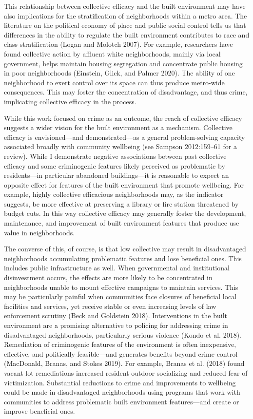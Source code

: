 \documentclass [11pt, proquest] {uwthesis}[2015/03/03]
\begin{document}
This relationship between collective efficacy and the built environment may have also implications for the stratification of neighborhoods within a metro area. The literature on the political economy of place and public social control tells us that differences in the ability to regulate the built environment contributes to race and class stratification (Logan and Molotch 2007). For example, researchers have found collective action by affluent white neighborhoods, mainly via local government, helps maintain housing segregation and concentrate public housing in poor neighborhoods (Einstein, Glick, and Palmer 2020). The ability of one neighborhood to exert control over its space can thus produce metro-wide consequences. This may foster the concentration of disadvantage, and thus crime, implicating collective efficacy in the process.

While this work focused on crime as an outcome, the reach of collective efficacy suggests a wider vision for the built environment as a mechanism. Collective efficacy is envisioned---and demonstrated---as a general problem-solving capacity associated broadly with community wellbeing (see Sampson 2012:159--61 for a review). While I demonstrate negative associations between past collective efficacy and some criminogenic features likely perceived as problematic by residents---in particular abandoned buildings---it is reasonable to expect an opposite effect for features of the built environment that promote wellbeing. For example, highly collective efficacious neighborhoods may, as the indicator suggests, be more effective at preserving a library or fire station threatened by budget cuts. In this way collective efficacy may generally foster the development, maintenance, and improvement of built environment features that produce use value in neighborhoods.

The converse of this, of course, is that low collective may result in disadvantaged neighborhoods accumulating problematic features and lose beneficial ones. This includes public infrastructure as well. When governmental and institutional disinvestment occurs, the effects are more likely to be concentrated in neighborhoods unable to mount effective campaigns to maintain services. This may be particularly painful when communities face closures of beneficial local facilities and services, yet receive stable or even increasing levels of law enforcement scrutiny (Beck and Goldstein 2018). Interventions in the built environment are a promising alternative to policing for addressing crime in disadvantaged neighborhoods, particularly serious violence (Kondo et al. 2018). Remediation of criminogenic features of the environment is often inexpensive, effective, and politically feasible---and generates benefits beyond crime control (MacDonald, Branas, and Stokes 2019). For example, Branas et al. (2018) found vacant lot remediations increased resident outdoor socializing and reduced fear of victimization. Substantial reductions to crime and improvements to wellbeing could be made in disadvantaged neighborhoods using programs that work with communities to address problematic built environment features---and create or improve beneficial ones.
\end{document}
